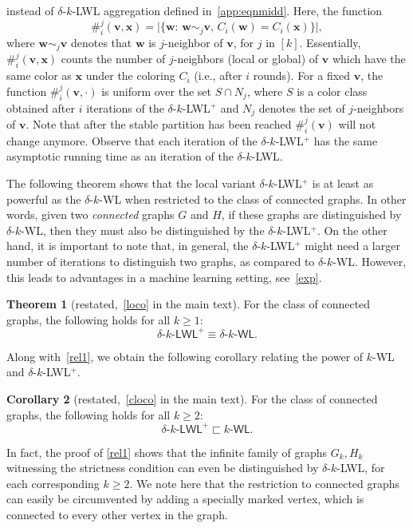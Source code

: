 \documentclass{article}
\theoremstyle{definition}
\newtheorem{theorem}{Theorem}
\newtheorem{corollary}[theorem]{Corollary}
\renewcommand{\vec}[1]{\mathbf{#1}}
\newcommand{\kwl}{$k$-\textsf{WL}\xspace}
\newcommand{\deltakwl}{$\delta$-$k$-\textsf{WL}\xspace}
\newcommand{\kwlm}{k\textrm{-}\textsf{WL}\xspace}
\newcommand{\deltakwlm}{\delta\textrm{-}k\textrm{-}\textsf{WL}\xspace}
\newcommand{\localkwl}{$\delta$-$k$-\textsf{LWL}\xspace}
\newcommand{\pluskwl}{$\delta$-$k$-\textsf{LWL}$^+$\xspace}
\newcommand{\pluskwlm}{\delta\textrm{-}k\textrm{-}\textsf{LWL}^+\xspace}
\begin{document}
instead of \localkwl aggregation defined in~\cref{app:eqnmidd}. 
Here, the function
\begin{equation*}
\#_{i}^j(\vec{v}, \vec{x}) = \big|\{ \vec{w} \colon \, \vec{w} \sim_j \vec{v}, \, C_{i}(\vec{w}) = C_{i}(\vec{x})   \} \big|,
\end{equation*}
where $\vec{w} \sim_j \vec{v}$ denotes that $\vec{w}$ is $j$-neighbor of $\vec{v}$, for $j$ in $[k]$. Essentially, $\#_{i}^j(\vec{v}, \vec{x})$ counts the number of $j$-neighbors (local or global) of $\vec{v}$ which have the same color as $\vec{x}$ under the coloring $C_i$ (i.e., after $i$ rounds). For a fixed $\vec{v}$,
the function $\#_{i}^j(\vec{v},\cdot)$ is uniform over the set $S \cap N_j$, where $S$ is a color class obtained after $i$ iterations of the \pluskwl and $N_j$ denotes the set of $j$-neighbors of $\vec{v}$. Note that after the stable partition has been reached $\#_{i}^j(\vec{v})$ will not change anymore. Observe that each iteration of the \pluskwl has the same asymptotic running time as an iteration of the \localkwl.

The following theorem shows that the local variant \pluskwl is at least as powerful as the \deltakwl when restricted to the class of connected graphs. In other words, given two \emph{connected} graphs $G$ and $H$, if these graphs are distinguished by \deltakwl, then they must also be distinguished by the \pluskwl. On the other hand, it is important to note that, in general, the \pluskwl might need a larger number of iterations to distinguish two graphs, as compared to \deltakwl. However, this leads to advantages in a machine learning setting, see~\cref{exp}.
\begin{theorem}[restated,~\cref{loco} in the main text]\label{app:loco}
	For the class of connected graphs, the following holds for all $k \geq 1$:
	\begin{equation*}
	\pluskwlm \equiv \deltakwlm.
	\end{equation*}
\end{theorem}	
Along with~\cref{rel1}, we obtain the following corollary relating the power of \kwl and \pluskwl. 
\begin{corollary}[restated,~\cref{cloco} in the main text] For the class of connected graphs, the following holds for all $k \geq 2$:	\begin{equation*}
	\pluskwlm \sqsubset \kwlm.
	\end{equation*}
\end{corollary}
In fact, the proof of \cref{rel1} shows that the infinite family of graphs $G_k, H_k$ witnessing the strictness condition can even be distinguished by \localkwl,
for each corresponding $k \geq 2$. We note here that the restriction to connected graphs can easily be circumvented by adding a specially marked vertex, which is connected to every other vertex in the graph.
\end{document}
